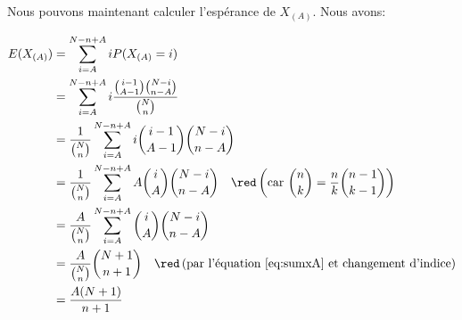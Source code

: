 \documentclass[10pt]{article}
\begin{document}
Nous pouvons maintenant calculer l'espérance de \(X_{(A)}\). Nous avons:

\begin{align}
E(X_{(A)}) &= \sum_{i=A}^{N-n+A} iP(X_{(A)}=i) \nonumber\\
&= \sum_{i=A}^{N-n+A} i\dfrac{\binom{i-1}{A-1}\binom{N-i}{n-A}}{\binom{N}{n}} \nonumber\\
&= \dfrac{1}{\binom{N}{n}}\sum_{i=A}^{N-n+A} i\binom{i-1}{A-1}\binom{N-i}{n-A} \nonumber\\
&= \dfrac{1}{\binom{N}{n}}\sum_{i=A}^{N-n+A} A\binom{i}{A}\binom{N-i}{n-A} 
\comeq{car $\binom{n}{k}=\dfrac{n}{k}\binom{n-1}{k-1}$} \nonumber\\
&= \dfrac{A}{\binom{N}{n}}\sum_{i=A}^{N-n+A} \binom{i}{A}\binom{N-i}{n-A} \nonumber\\
&= \dfrac{A}{\binom{N}{n}}\binom{N+1}{n+1} \comeq{par l'équation \ref{eq:sumxA} et changement d'indice} \nonumber\\
&= \dfrac{A(N+1)}{n+1} \label{eq:esperancexA}
\end{align}


\end{document}
